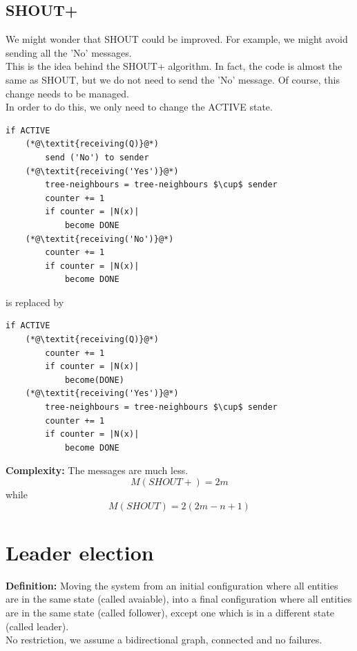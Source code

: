 \documentclass[paper=a4, fontsize=11pt]{scrartcl} %
\numberwithin{equation}{section} %
\numberwithin{figure}{section} %
\numberwithin{table}{section} %
\begin{document}
\subsection*{SHOUT+}
We might wonder that SHOUT could be improved. For example, we might avoid sending all the 'No' messages.
\\ This is the idea behind the SHOUT+ algorithm. In fact, the code is almost the same as SHOUT, but we do not need to send the 'No' message. Of course, this change needs to be managed.\\
In order to do this, we only need to change the ACTIVE state.
\begin{lstlisting}
if ACTIVE
	(*@\textit{receiving(Q)}@*)
		send ('No') to sender
	(*@\textit{receiving('Yes')}@*)
		tree-neighbours = tree-neighbours $\cup$ sender
		counter += 1
		if counter = |N(x)|
			become DONE
	(*@\textit{receiving('No')}@*)
		counter += 1
		if counter = |N(x)|
			become DONE	
\end{lstlisting}
is replaced by 
\begin{lstlisting}
if ACTIVE
	(*@\textit{receiving(Q)}@*)
		counter += 1
		if counter = |N(x)|
			become(DONE)
	(*@\textit{receiving('Yes')}@*)
		tree-neighbours = tree-neighbours $\cup$ sender
		counter += 1
		if counter = |N(x)|
			become DONE
\end{lstlisting}
\textbf{Complexity:} The messages are much less. 
$$M(SHOUT+) = 2m$$ while $$M(SHOUT) = 2(2m -n+1)$$

\clearpage
\section*{Leader election}
\textbf{Definition:} Moving the system from an initial configuration where all entities are in the same state (called avaiable), into a final configuration where all entities are in the same state (called follower), except one which is in a different state (called leader).\\
No restriction, we assume a bidirectional graph, connected and no failures.\\
\end{document}
